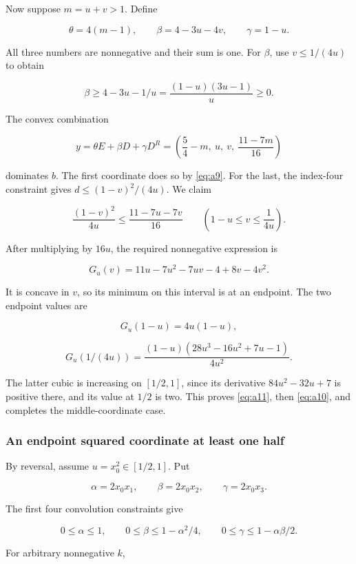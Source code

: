 Now suppose \(m=u+v>1\). Define

\[
\theta=4(m-1),\qquad \beta=4-3u-4v,\qquad \gamma=1-u.
\]

All three numbers are nonnegative and their sum is one. For \(\beta\), use
\(v\le1/(4u)\) to obtain

\[
\beta\ge4-3u-1/u=\frac{(1-u)(3u-1)}{u}\ge0.
\]

The convex combination

\begin{equation}\label{eq:a10}
y=\theta E+\beta D+\gamma D^R
=\left(\frac54-m,\ u,\ v,\ \frac{11-7m}{16}\right)
\end{equation}

dominates \(b\). The first coordinate does so by \eqref{eq:a9}. For the last, the
index-four constraint gives \(d\le(1-v)^2/(4u)\). We claim

\begin{equation}\label{eq:a11}
\frac{(1-v)^2}{4u}\le\frac{11-7u-7v}{16}
\qquad\left(1-u\le v\le\frac1{4u}\right).
\end{equation}

After multiplying by \(16u\), the required nonnegative expression is

\[
G_u(v)=11u-7u^2-7uv-4+8v-4v^2.
\]

It is concave in \(v\), so its minimum on this interval is at an endpoint.
The two endpoint values are

\[
G_u(1-u)=4u(1-u),
\]

\[
G_u(1/(4u))
=\frac{(1-u)(28u^3-16u^2+7u-1)}{4u^2}.
\]

The latter cubic is increasing on \([1/2,1]\), since its derivative
\(84u^2-32u+7\) is positive there, and its value at \(1/2\) is two.
This proves \eqref{eq:a11}, then \eqref{eq:a10}, and completes the middle-coordinate case.

\subsubsection{An endpoint squared coordinate at least one half}

By reversal, assume \(u=x_0^2\in[1/2,1]\). Put

\[
\alpha=2x_0x_1,\qquad \beta=2x_0x_2,\qquad \gamma=2x_0x_3.
\]

The first four convolution constraints give

\[
0\le\alpha\le1,\qquad
0\le\beta\le1-\alpha^2/4,\qquad
0\le\gamma\le1-\alpha\beta/2.
\]

For arbitrary nonnegative \(k\),

